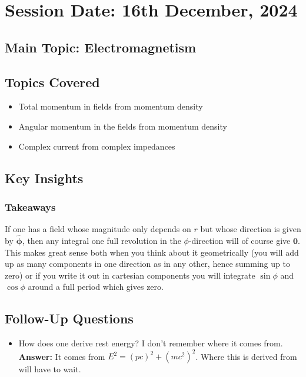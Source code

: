 \section{Session Date: 16th December, 2024}
\subsection*{Main Topic: Electromagnetism}
\subsection*{Topics Covered}
\begin{itemize}
    \item Total momentum in fields from momentum density
    \item Angular momentum in the fields from momentum density
    \item Complex current from complex impedances
\end{itemize}

\subsection*{Key Insights}
\subsubsection*{Takeaways}
If one has a field whose magnitude only depends on \(r\) but whose direction is given by \(\hat{\mathbf{\phi}}\), then any integral one full revolution in the \(\phi \)-direction will of course give \(\mathbf{0}\). This makes great sense both when you think about it geometrically (you will add up as many components in one direction as in any other, hence summing up to zero) or if you write it out in cartesian components you will integrate \(\sin \phi \) and \(\cos \phi \) around a full period which gives zero.

\subsection*{Follow-Up Questions}
\begin{itemize}
    \item How does one derive rest energy? I don't remember where it comes from.
    \textbf{Answer:} It comes from \(E^{2} = (pc)^{2} + (m c^{2} )^{2} \). Where this is derived from will have to wait.
\end{itemize}
